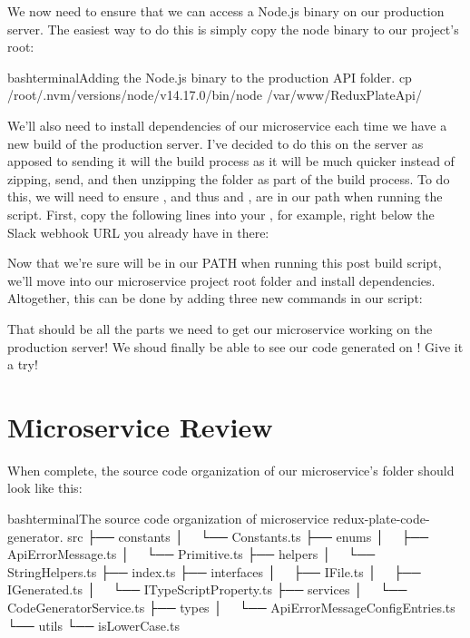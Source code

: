 \documentclass[a4paper,headinclude=on,footinclude=on,12pt,oneside]{scrbook}
\begin{document}
We now need to ensure that we can access a Node.js binary on our production server. The easiest way to do this is simply copy the node binary to our project's root:

\begin{codeInput}{bash}{terminal}{Adding the Node.js binary to the production API folder.}
cp /root/.nvm/versions/node/v14.17.0/bin/node /var/www/ReduxPlateApi/
\end{codeInput}

We'll also need to install  dependencies of our microservice each time we have a new build of the production server. I've decided to do this on the server as apposed to sending it will the build process as it will be much quicker instead of zipping, send, and then unzipping the  folder as part of the build process. To do this, we will need to ensure , and thus  and , are in our path when running the  script. First, copy the following lines into your , for example, right below the Slack webhook URL you already have in there:


Now that we're sure  will be in our PATH when running this post build script, we'll move into our microservice project root folder and install dependencies. Altogether, this can be done by adding three new commands in our  script:


That should be all the parts we need to get our microservice working on the production server! We shoud finally be able to see our code generated on ! Give it a try!

\section{Microservice Review}

When complete, the source code organization of our microservice's  folder should look like this:

\begin{codeInput}{bash}{terminal}{The source code organization of microservice redux-plate-code-generator.}
src
├── constants
│   └── Constants.ts
├── enums
│   ├── ApiErrorMessage.ts
│   └── Primitive.ts
├── helpers
│   └── StringHelpers.ts
├── index.ts
├── interfaces
│   ├── IFile.ts
│   ├── IGenerated.ts
│   └── ITypeScriptProperty.ts
├── services
│   └── CodeGeneratorService.ts
├── types
│   └── ApiErrorMessageConfigEntries.ts
└── utils
    └── isLowerCase.ts
\end{codeInput}
\end{document}
